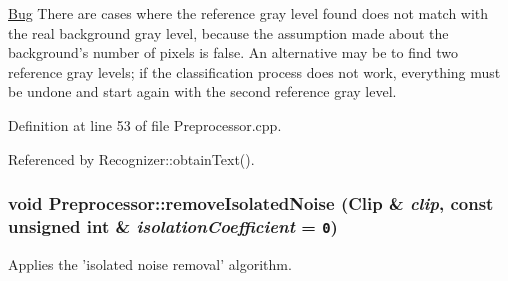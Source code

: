 \begin{Desc}
\item[\hyperlink{bug__bug000001}{Bug}]There are cases where the reference gray level found does not match with the real background gray level, because the assumption made about the background's number of pixels is false. An alternative may be to find two reference gray levels; if the classification process does not work, everything must be undone and start again with the second reference gray level. \end{Desc}


Definition at line 53 of file Preprocessor.cpp.

Referenced by Recognizer::obtainText().\hypertarget{class_preprocessor_a3e047486a0a80f2103f51d7141e41c5}{
\subsubsection[removeIsolatedNoise]{\setlength{\rightskip}{0pt plus 5cm}void Preprocessor::removeIsolatedNoise ({\bf Clip} \& {\em clip}, \/  const unsigned int \& {\em isolationCoefficient} = {\tt 0})}}
\label{class_preprocessor_a3e047486a0a80f2103f51d7141e41c5}


Applies the 'isolated noise removal' algorithm. 

